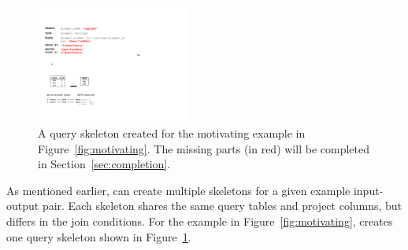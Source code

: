 
\vspace{1mm}



%

\begin{figure}[t]
	\centering
		\includegraphics[width=0.45\textwidth]{sql_skeleton.pdf}
        \vspace{-3mm}
	\caption{A query skeleton created for the motivating example
in Figure~\ref{fig:motivating}. The missing parts (in red) will
be completed in Section~\ref{sec:completion}.}
	\label{fig:skeleton}
\end{figure}


As mentioned earlier, \ourtool can create multiple skeletons
for a given example input-output pair. Each skeleton
shares the same query tables and project columns, but differs
in the join conditions.
For the example in Figure~\ref{fig:motivating},
\ourtool creates one query skeleton shown in Figure~\ref{fig:skeleton}.






